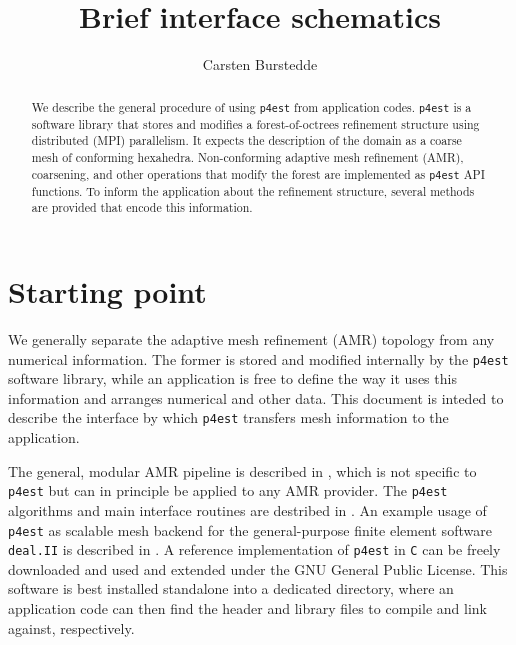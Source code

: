 \documentclass[letterpaper,11pt]{article}
\author{Carsten Burstedde}
\title{Brief \pforest interface schematics}
\newcommand{\dealii}{\texttt{deal.II}\xspace}
\newcommand{\pforest}{\texttt{p4est}\xspace}
\begin{document}
\maketitle

\begin{abstract}
We describe the general procedure of using \pforest from application codes.
\pforest is a software library that stores and modifies a forest-of-octrees
refinement structure using distributed (MPI) parallelism.  It expects the
description of the domain as a coarse mesh of conforming hexahedra.
Non-conforming adaptive mesh refinement (AMR), coarsening, and other operations
that modify the forest are implemented as \pforest API functions.  To inform
the application about the refinement structure, several methods are provided
that encode this information.
\end{abstract}

\section{Starting point}

We generally separate the adaptive mesh refinement (AMR) topology from any
numerical information.  The former is stored and modified internally by the
\pforest software library, while an application is free to define the way it
uses this information and arranges numerical and other data.  This document is
inteded to describe the interface by which \pforest transfers mesh information
to the application.

The general, modular AMR pipeline is described in
\cite{BursteddeGhattasStadlerEtAl08}, which is not specific to \pforest but can
in principle be applied to any AMR provider.  The \pforest algorithms and main
interface routines are destribed in \cite{BursteddeWilcoxGhattas11}.
An example usage of \pforest as scalable mesh backend for the general-purpose
finite element software \dealii is described in
\cite{BangerthBursteddeHeisterEtAl11}.  A reference implementation of \pforest
in \texttt{C} can be freely downloaded \cite{Burstedde10} and used and extended
under the GNU General Public License.  This software is best installed
standalone into a dedicated directory, where an application code can then find
the header and library files to compile and link against, respectively.
\end{document}
